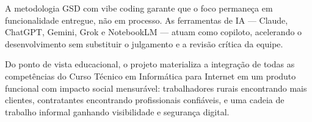 \documentclass[12pt, a4paper]{article}
\begin{document}
A metodologia GSD com vibe coding garante que o foco permaneça em
funcionalidade entregue, não em processo. As ferramentas de IA ---
Claude, ChatGPT, Gemini, Grok e NotebookLM --- atuam como copiloto,
acelerando o desenvolvimento sem substituir o julgamento e a revisão
crítica da equipe.

Do ponto de vista educacional, o projeto materializa a integração de todas
as competências do Curso Técnico em Informática para Internet em um produto
funcional com impacto social mensurável: trabalhadores rurais encontrando
mais clientes, contratantes encontrando profissionais confiáveis, e uma
cadeia de trabalho informal ganhando visibilidade e segurança digital.

\newpage


\end{document}
